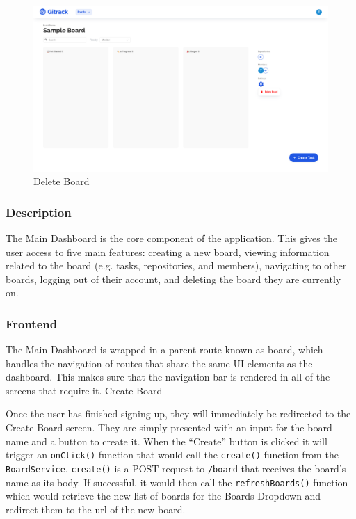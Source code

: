 \documentclass{article}
\def\code#1{\texttt{#1}}
\begin{document}
\begin{figure}[H]
	\includegraphics[width=1\textwidth]{board-delete}\par\vspace{0.5cm}
	\caption{Delete Board}
	\label{fig:board-delete}
\end{figure}

\subsubsection{Description}
The Main Dashboard is the core component of the application. This gives the user
access to five main features: creating a new board, viewing information related
to the board (e.g. tasks, repositories, and members), navigating to other
boards, logging out of their account, and deleting the board they are currently
on.

\subsubsection{Frontend}
The Main Dashboard is wrapped in a parent route known as board, which handles
the navigation of routes that share the same UI elements as the dashboard. This
makes sure that the navigation bar is rendered in all of the screens that
require it. Create Board

Once the user has finished signing up, they will immediately be redirected to
the Create Board screen. They are simply presented with an input for the board
name and a button to create it. When the “Create” button is clicked it will
trigger an \code{onClick()} function that would call the \code{create()}
function from the \code{BoardService}. \code{create()} is a POST request to
\code{/board} that receives the board’s name as its body. If successful, it
would then call the \code{refreshBoards()} function which would retrieve the new
list of boards for the Boards Dropdown and redirect them to the url of the new
board.
\end{document}
